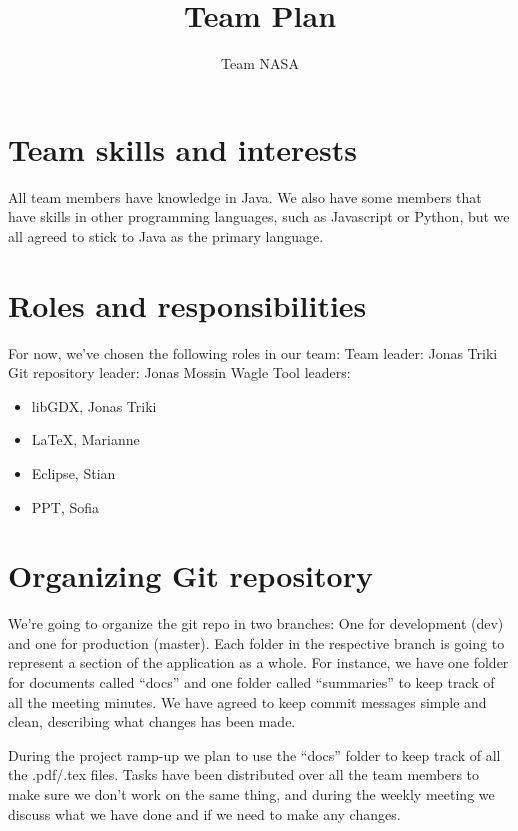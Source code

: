 \documentclass{article}
\title{Team Plan}
\author{Team NASA}
\date{}
\begin{document}
\maketitle

\section*{Team skills and interests}
All team members have knowledge in Java. We also have some members that have skills in other programming languages, such as Javascript or Python, but we all agreed to stick to Java as the primary language.

\section*{Roles and responsibilities}
For now, we've chosen the following roles in our team:
\newline Team leader: Jonas Triki
\newline Git repository leader: Jonas Mossin Wagle
\newline Tool leaders:
\begin{itemize}
    \item libGDX, Jonas Triki
    \item LaTeX, Marianne
    \item Eclipse, Stian
    \item PPT, Sofia
\end{itemize}

\section*{Organizing Git repository}

We’re going to organize the git repo in two branches: One for development (dev) and one for production (master). Each folder in the respective branch is going to represent a section of the application as a whole. For instance, we have one folder for documents called “docs” and one folder called “summaries” to keep track of all the meeting minutes. We have agreed to keep commit messages simple and clean, describing what changes has been made.

During the project ramp-up we plan to use the “docs” folder to keep track of all the .pdf/.tex files. Tasks have been distributed over all the team members to make sure we don’t work on the same thing, and during the weekly meeting we discuss what we have done and if we need to make any changes.
\end{document}
